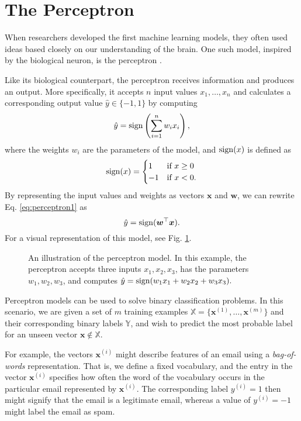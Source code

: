 \section{The Perceptron}
\label{sec:perceptron}
When researchers developed the first machine learning models, they often used ideas based closely on our understanding of the brain. One such model, inspired by the biological neuron, is the perceptron \cite{McCulloch1943115}.

Like its biological counterpart, the perceptron receives information and produces an output. More specifically, it accepts $n$ input values $x_1, \ldots, x_n$ and calculates a corresponding output value $\hat{y} \in \{-1, 1\}$ by computing
\begin{equation}\label{eq:perceptron1}
	\hat{y} = \operatorname{sign}\left (\sum_{i=1}^{n} w_ix_i\right ),
\end{equation}
where the weights $w_i$ are the parameters of the model, and $\operatorname{sign}(x)$ is defined as
\begin{equation}
\operatorname{sign}(x) = \begin{cases} 1 & \text{if }x \geq 0
							\\-1 & \text{if }x < 0.
\end{cases}
\end{equation}
By representing the input values and weights as vectors $\bm{x}$ and $\bm{w}$, we can rewrite Eq. \eqref{eq:perceptron1} as
\begin{equation}
\hat{y} = \operatorname{sign}(\bm{w}^\top\bm{x}).
\end{equation}
For a visual representation of this model, see Fig. \ref{fig:perceptron}. 

\begin{figure}
	\begin{center}
		
	\end{center}
	\caption{An illustration of the perceptron model. In this example, the perceptron accepts three inputs $x_1, x_2, x_3$, has the parameters $w_1, w_2, w_3$, and computes $\hat{y} = \operatorname{sign}(w_1x_1 + w_2x_2 + w_3x_3).$}
	\label{fig:perceptron}
\end{figure}

Perceptron models can be used to solve binary classification problems. In this scenario, we are given a set of $m$ training examples $\mathbb{X} = \{\bm{x}^{(1)}, \ldots, \bm{x}^{(m)}\}$ and their corresponding binary labels $\mathbb{Y}$, and wish to predict the most probable label for an unseen vector $\bm{x} \notin \mathbb{X}$.

For example, the vectors $\bm{x}^{(i)}$ might describe features of an email using a \emph{bag-of-words} representation. That is, we define a fixed vocabulary, and the  entry in the vector $\bm{x}^{(i)}$ specifies how often the  word of the vocabulary occurs in the particular email represented by $\bm{x}^{(i)}$. The corresponding label $y^{(i)} = 1$ then might signify that the email is a legitimate email, whereas a value of $y^{(i)} = -1$ might label the email as spam.

